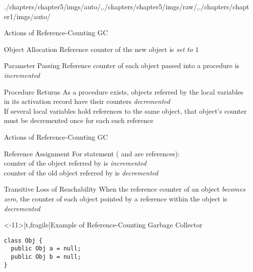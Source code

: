 \begin{graphicspathcontext}{{./chapters/chapter5/imgs/auto/},{./chapters/chapter5/imgs/raw/},{./chapters/chapter1/imgs/auto/}}
\begin{bibunit}[apalike]
\begin{frame}{Actions of Reference-Counting GC}
	\begin{block}{Object Allocation}
		Reference counter of the new object is \emph{set to $1$}
	\end{block}
	\vspace{.5cm}
	\begin{block}{Parameter Passing}
		Reference counter of each object passed into a procedure is \emph{incremented}
	\end{block}
	\vspace{.5cm}
	\begin{block}{Procedure Returns}
		As a procedure exists, objects referred by the local variables in its activation record have their counters \emph{decremented} \\
		If several local variables hold references to the same object, that object's counter must be decremented once for each such reference
	\end{block}
\end{frame}

 \begin{frame}{Actions of Reference-Counting GC \insertcontinuationtext}
	\begin{block}{Reference Assignment}
		For statement  ( and  are references): \\
		counter of the object referred by  is \emph{incremented} \\
		counter of the old object referred by  is \emph{decremented}
	\end{block}
	\vspace{.5cm}
	\begin{block}{Transitive Loss of Reachability}
		When the reference counter of an object \emph{becomes zero}, the counter of each object pointed by a reference within the object is \emph{decremented}
	\end{block}
\end{frame}

\begin{frame}<-11>[t,fragile]{Example of Reference-Counting Garbage Collector}
	\begin{lstlisting}[style=lststyle-java,linewidth={.4\linewidth}]
class Obj {
  public Obj a = null;
  public Obj b = null;
}


\end{lstlisting}
\end{frame}
\end{bibunit}
\end{graphicspathcontext}

